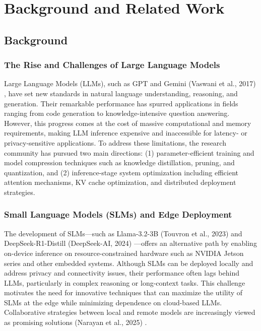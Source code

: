 \chapter{Background and Related Work}
\label{chapter:background}

\section{Background}
\subsection{The Rise and Challenges of Large Language Models}
Large Language Models (LLMs), such as GPT and Gemini (Vaswani et al., 2017) \cite{Vaswani2017Attention}, have set new standards in natural language understanding, reasoning, and generation. Their remarkable performance has spurred applications in fields ranging from code generation to knowledge-intensive question answering. However, this progress comes at the cost of massive computational and memory requirements, making LLM inference expensive and inaccessible for latency- or privacy-sensitive applications. To address these limitations, the research community has pursued two main directions: (1) parameter-efficient training and model compression techniques such as knowledge distillation, pruning, and quantization, and (2) inference-stage system optimization including efficient attention mechanisms, KV cache optimization, and distributed deployment strategies.

\subsection{Small Language Models (SLMs) and Edge Deployment}
The development of SLMs—such as Llama-3.2-3B (Touvron et al., 2023) \cite{Touvron2023LLaMA} and DeepSeek-R1-Distill (DeepSeek-AI, 2024) \cite{DeepSeek-RL}—offers an alternative path by enabling on-device inference on resource-constrained hardware such as NVIDIA Jetson series and other embedded systems. Although SLMs can be deployed locally and address privacy and connectivity issues, their performance often lags behind LLMs, particularly in complex reasoning or long-context tasks. This challenge motivates the need for innovative techniques that can maximize the utility of SLMs at the edge while minimizing dependence on cloud-based LLMs. Collaborative strategies between local and remote models are increasingly viewed as promising solutions (Narayan et al., 2025) \cite{Narayan2025Minions}.


